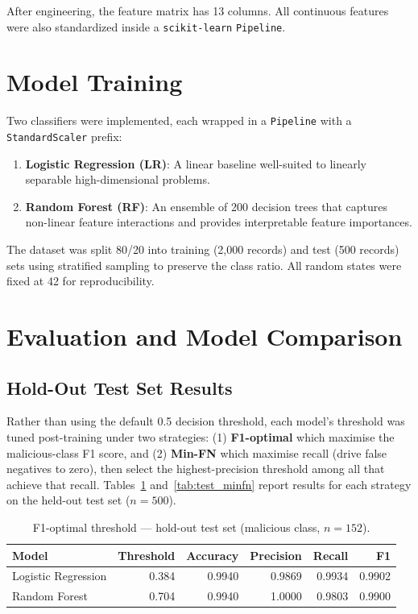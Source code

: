 \documentclass[11pt]{article}
\begin{document}
After engineering, the feature matrix has 13 columns. All continuous features
were also standardized inside a
\texttt{scikit-learn} \texttt{Pipeline}.

\section{Model Training}
\label{sec:models}

Two classifiers were implemented, each wrapped in a \texttt{Pipeline}
with a \texttt{StandardScaler} prefix:

\begin{enumerate}
    \item \textbf{Logistic Regression (LR)}: A linear baseline well-suited to
          linearly separable high-dimensional problems.
    \item \textbf{Random Forest (RF)}: An ensemble of 200 decision trees that
          captures non-linear feature interactions and provides interpretable
          feature importances.
\end{enumerate}

The dataset was split 80/20 into training (2,000 records) and test
(500 records) sets using stratified sampling to preserve the class ratio.
All random states were fixed at 42 for reproducibility.

\section{Evaluation and Model Comparison}
\label{sec:eval}

\subsection{Hold-Out Test Set Results}

Rather than using the default 0.5 decision threshold, each model's threshold
was tuned post-training under two strategies: (1) \textbf{F1-optimal} which
maximise the malicious-class F1 score, and (2) \textbf{Min-FN} which maximise
recall (drive false negatives to zero), then select the highest-precision
threshold among all that achieve that recall.
Tables~\ref{tab:test_f1} and~\ref{tab:test_minfn} report results for each
strategy on the held-out test set ($n=500$).

\begin{table}[H]
\centering
\caption{F1-optimal threshold --- hold-out test set (malicious class, $n=152$).}
\label{tab:test_f1}
\begin{tabular}{lrrrrr}
\toprule
\textbf{Model} & \textbf{Threshold} & \textbf{Accuracy} & \textbf{Precision} & \textbf{Recall} & \textbf{F1} \\
\midrule
Logistic Regression  & 0.384 & 0.9940 & 0.9869 & 0.9934 & 0.9902 \\
Random Forest        & 0.704 & 0.9940 & 1.0000 & 0.9803 & 0.9900 \\
\bottomrule
\end{tabular}
\end{table}
\end{document}
